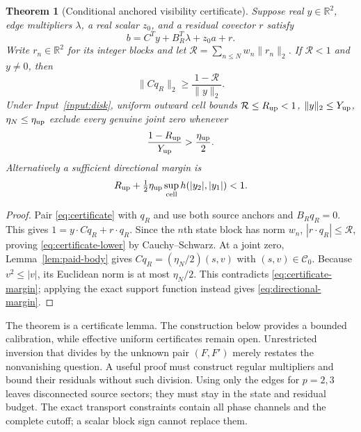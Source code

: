 \documentclass[11pt]{article}
\newtheorem{theorem}{Theorem}[section]
\theoremstyle{definition}
\theoremstyle{remark}
\begin{document}
\begin{theorem}[Conditional anchored visibility certificate]
\label{thm:certificate}
Suppose real $y\in\mathbb R^2$, edge multipliers $\lambda$, a real scalar
$z_0$, and a residual covector $r$ satisfy
\begin{equation}
 b=C^Ty+B_R^T\lambda+z_0a+r.
 \label{eq:certificate}
\end{equation}
Write $r_n\in\mathbb R^2$ for its integer blocks and let
$\mathcal R=\sum_{n\le N}w_n\|r_n\|_2$.
If $\mathcal R<1$ and $y\ne0$, then
\begin{equation}
 \|Cq_R\|_2\ge\frac{1-\mathcal R}{\|y\|_2}.
 \label{eq:certificate-lower}
\end{equation}
Under Input~\ref{input:disk}, uniform outward cell bounds
$\mathcal R\le R_{\rm up}<1$, $\|y\|_2\le Y_{\rm up}$,
$\eta_N\le\eta_{\rm up}$ exclude every genuine joint zero whenever
\begin{equation}
 \frac{1-R_{\rm up}}{Y_{\rm up}}>\frac{\eta_{\rm up}}2.
 \label{eq:certificate-margin}
\end{equation}
Alternatively a sufficient directional margin is
\begin{equation}
 R_{\rm up}+\tfrac12\eta_{\rm up}
       \sup_{\rm cell}h(|y_2|,|y_1|)<1.
 \label{eq:directional-margin}
\end{equation}
\end{theorem}
\begin{proof}
Pair \eqref{eq:certificate} with $q_R$ and use both source anchors and
$B_Rq_R=0$. This gives $1=y\cdot Cq_R+r\cdot q_R$.
Since the $n$th state block has norm $w_n$,
$|r\cdot q_R|\le\mathcal R$, proving
\eqref{eq:certificate-lower} by Cauchy--Schwarz.
At a joint zero, Lemma~\ref{lem:paid-body} gives
$Cq_R=(\eta_N/2)(s,v)$ with $(s,v)\in\mathcal C_0$.
Because $v^2\le|v|$, its Euclidean norm is at most $\eta_N/2$.
This contradicts \eqref{eq:certificate-margin}; applying the exact
support function instead gives \eqref{eq:directional-margin}.
\end{proof}

The theorem is a certificate lemma. The construction below provides a
bounded calibration, while effective uniform certificates remain open.
Unrestricted inversion that divides by the unknown pair
$(F,F')$ merely restates the nonvanishing question. A useful proof must
construct regular multipliers and bound their residuals without such
division. Using only the edges for $p=2,3$ leaves disconnected source
sectors; they must stay in the state and residual budget. The exact
transport constraints contain all phase channels and the complete cutoff;
a scalar block sign cannot replace them.
\end{document}
